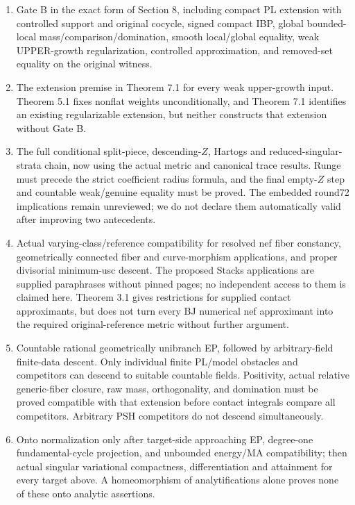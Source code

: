 \documentclass[
  10pt,
]{article}
\providecommand{\tightlist}{%
  \setlength{\itemsep}{0pt}\setlength{\parskip}{0pt}}
\begin{document}
\begin{enumerate}
\def\labelenumi{\arabic{enumi}.}
\tightlist
\item
  Gate B in the exact form of Section 8, including compact PL extension
  with controlled support and original cocycle, signed compact IBP,
  global bounded-local mass/comparison/domination, smooth local/global
  equality, weak UPPER-growth regularization, controlled approximation,
  and removed-set equality on the original witness.
\item
  The extension premise in Theorem 7.1 for every weak upper-growth
  input. Theorem 5.1 fixes nonflat weights unconditionally, and Theorem
  7.1 identifies an existing regularizable extension, but neither
  constructs that extension without Gate B.
\item
  The full conditional split-piece, descending-\(Z\), Hartogs and
  reduced-singular-strata chain, now using the actual metric and
  canonical trace results. Runge must precede the strict coefficient
  radius formula, and the final empty-\(Z\) step and countable
  weak/genuine equality must be proved. The embedded round72
  implications remain unreviewed; we do not declare them automatically
  valid after improving two antecedents.
\item
  Actual varying-class/reference compatibility for resolved nef fiber
  constancy, geometrically connected fiber and curve-morphism
  applications, and proper divisorial minimum-usc descent. The proposed
  Stacks applications are supplied paraphrases without pinned pages; no
  independent access to them is claimed here. Theorem 3.1 gives
  restrictions for supplied contact approximants, but does not turn
  every BJ numerical nef approximant into the required
  original-reference metric without further argument.
\item
  Countable rational geometrically unibranch EP, followed by
  arbitrary-field finite-data descent. Only individual finite PL/model
  obstacles and competitors can descend to suitable countable fields.
  Positivity, actual relative generic-fiber closure, raw mass,
  orthogonality, and domination must be proved compatible with that
  extension before contact integrals compare all competitors. Arbitrary
  PSH competitors do not descend simultaneously.
\item
  Onto normalization only after target-side approaching EP, degree-one
  fundamental-cycle projection, and unbounded energy/MA compatibility;
  then actual singular variational compactness, differentiation and
  attainment for every target above. A homeomorphism of analytifications
  alone proves none of these onto analytic assertions.
\end{enumerate}
\end{document}

